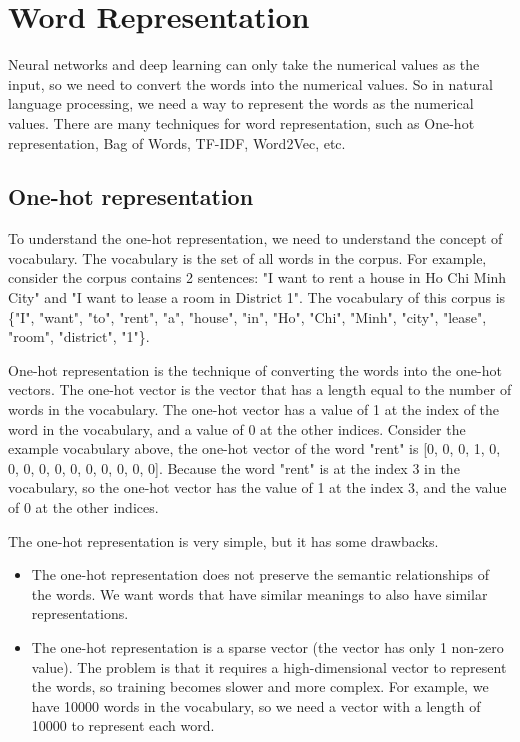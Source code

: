 \section{Word Representation}
Neural networks and deep learning can only take the numerical values as the input, so we need to convert the words into the numerical values. So in natural language processing, we need a way to represent the words as the numerical values. There are many techniques for word representation, such as One-hot representation, Bag of Words, TF-IDF, Word2Vec, etc. 

\subsection{One-hot representation}
To understand the one-hot representation, we need to understand the concept of vocabulary. The vocabulary is the set of all words in the corpus. For example, consider the corpus contains 2 sentences: "I want to rent a house in Ho Chi Minh City" and "I want to lease a room in District 1". The vocabulary of this corpus is \{"I", "want", "to", "rent", "a", "house", "in", "Ho", "Chi", "Minh", "city", "lease", "room", "district", "1"\}.

One-hot representation is the technique of converting the words into the one-hot vectors. The one-hot vector is the vector that has a length equal to the number of words in the vocabulary. The one-hot vector has a value of 1 at the index of the word in the vocabulary, and a value of 0 at the other indices. Consider the example vocabulary above, the one-hot vector of the word "rent" is [0, 0, 0, 1, 0, 0, 0, 0, 0, 0, 0, 0, 0, 0, 0]. Because the word "rent" is at the index 3 in the vocabulary, so the one-hot vector has the value of 1 at the index 3, and the value of 0 at the other indices.

\noindent The one-hot representation is very simple, but it has some drawbacks. 
\begin{itemize}
    \item The one-hot representation does not preserve the semantic relationships of the words. We want words that have similar meanings to also have similar representations.
    \item The one-hot representation is a sparse vector (the vector has only 1 non-zero value). The problem is that it requires a high-dimensional vector to represent the words, so training becomes slower and more complex. For example, we have 10000 words in the vocabulary, so we need a vector with a length of 10000 to represent each word.
\end{itemize}

